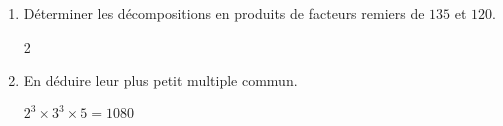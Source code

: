     \begin{enumerate}
        \item Déterminer les décompositions en produits de facteurs remiers de $135$ et $120$.

        \begin{multicols}2
        \columnbreak
        \end{multicols}
        \item En déduire leur plus petit multiple commun.

        $2^3\times 3^3\times 5=\num{1080}$
    \end{enumerate}


